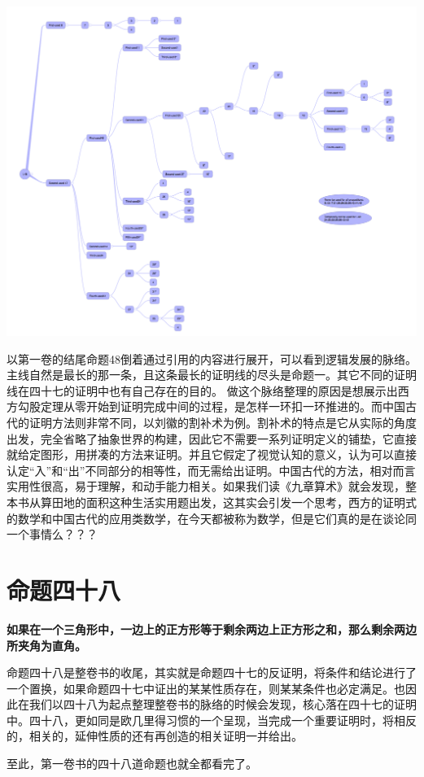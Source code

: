 \documentclass[
]{book}
\begin{document}
\includegraphics[width=1\linewidth]{./image/18-prop48-image15}

以第一卷的结尾命题48倒着通过引用的内容进行展开，可以看到逻辑发展的脉络。主线自然是最长的那一条，且这条最长的证明线的尽头是命题一。其它不同的证明线在四十七的证明中也有自己存在的目的。
做这个脉络整理的原因是想展示出西方勾股定理从零开始到证明完成中间的过程，是怎样一环扣一环推进的。而中国古代的证明方法则非常不同，以刘徽的割补术为例。割补术的特点是它从实际的角度出发，完全省略了抽象世界的构建，因此它不需要一系列证明定义的铺垫，它直接就给定图形，用拼凑的方法来证明。并且它假定了视觉认知的意义，认为可以直接认定``入''和``出''不同部分的相等性，而无需给出证明。中国古代的方法，相对而言实用性很高，易于理解，和动手能力相关。如果我们读《九章算术》就会发现，整本书从算田地的面积这种生活实用题出发，这其实会引发一个思考，西方的证明式的数学和中国古代的应用类数学，在今天都被称为数学，但是它们真的是在谈论同一个事情么？？？

\hypertarget{ux547dux9898ux56dbux5341ux516b}{%
\section{命题四十八}\label{ux547dux9898ux56dbux5341ux516b}}

\textbf{如果在一个三角形中，一边上的正方形等于剩余两边上正方形之和，那么剩余两边所夹角为直角。}

命题四十八是整卷书的收尾，其实就是命题四十七的反证明，将条件和结论进行了一个置换，如果命题四十七中证出的某某性质存在，则某某条件也必定满足。也因此在我们以四十八为起点整理整卷书的脉络的时候会发现，核心落在四十七的证明中。四十八，更如同是欧几里得习惯的一个呈现，当完成一个重要证明时，将相反的，相关的，延伸性质的还有再创造的相关证明一并给出。

至此，第一卷书的四十八道命题也就全都看完了。

  
\end{document}
